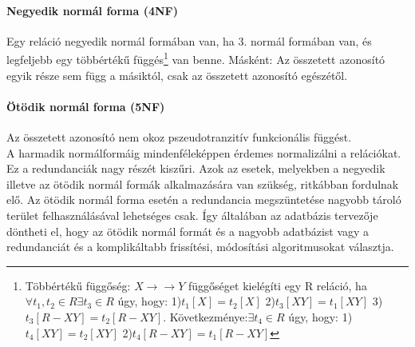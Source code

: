 \paragraph{Negyedik normál forma (4NF)}
Egy reláció negyedik normál formában van, ha 3. normál formában van, és legfeljebb egy többértékű függés\footnote{Többértékű függőség: $X \to\to Y$ függőséget kielégíti egy R reláció, ha $\forall t_1,t_2 \in R \exists t_3 \in R$ úgy, hogy: 1)$t_1[X]=t_2[X]$ 2)$t_3[XY]=t_1[XY]$ 3)$t_3[R-XY]=t_2[R-XY]$. Következménye:$\exists t_4\in R$ úgy, hogy: 1)$t_4[XY]=t_2[XY]$ 2)$t_4[R-XY]=t_1[R-XY]$} van benne. Másként: Az összetett azonosító egyik része sem függ a másiktól, csak az összetett azonosító egészétől.
\paragraph{Ötödik normál forma (5NF)}
Az összetett azonosító nem okoz pszeudotranzitív funkcionális függést.\\

A harmadik normálformáig mindenféleképpen érdemes normalizálni a relációkat. Ez a redundanciák nagy részét kiszűri. Azok az esetek, melyekben a negyedik illetve az ötödik normál formák alkalmazására van szükség, ritkábban fordulnak elő. Az ötödik normál forma esetén a redundancia megszüntetése nagyobb tároló terület felhasználásával lehetséges csak. Így általában az adatbázis tervezője döntheti el, hogy az ötödik normál formát és a nagyobb adatbázist vagy a redundanciát és a komplikáltabb frissítési, módosítási algoritmusokat választja.


